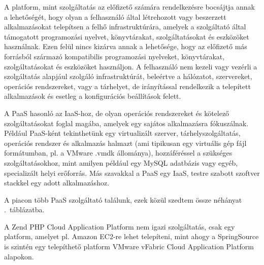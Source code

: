 A platform, mint szolgáltatás az előfizető számára rendelkezésre bocsájtja annak a lehetőségét, hogy olyan a felhasználó által létrehozott vagy beszerzett alkalmazásokat telepítsen a felhő infrastruktúrára, amelyek a szolgáltató által támogatott programozási nyelvet, könyvtárakat, szolgáltatásokat és eszközöket használnak. Ezen felül nincs kizárva  annak a lehetősége, hogy az előfizető más forrásból származó kompatibilis programozási nyelveket, könyvtárakat, szolgáltatásokat és eszközöket használjon. A felhasználó nem kezeli vagy vezérli a szolgáltatás alapjául szolgáló infrastruktúrát, beleértve a hálózatot, szervereket, operációs rendszereket, vagy a tárhelyet, de irányítással rendelkezik a telepített alkalmazások és esetleg a konfigurációs beállítások felett.\cite{nistsp800-145}

A PaaS hasonló az IaaS-hoz, de olyan operációs rendszereket és kötelező szolgáltatásokat foglal magába, amelyek egy sajátos alkalmazásra fókuszálnak. Például PaaS-ként tekinthetünk egy virtualizált szerver, tárhelyszolgáltatás, operációs rendszer és alkalmazás halmazt (ami tipikusan egy virtuális gép fájl formátumban, pl. a VMware .vmdk állománya), hozzáféréssel a szükséges szolgáltatásokhoz, mint amilyen például egy MySQL adatbázis vagy egyéb, specializált helyi erőforrás. Más szavakkal a PaaS egy IaaS, testre szabott szoftver stackkel egy adott alkalmazáshoz.\cite{ccwlinux}

A piacon több PaaS szolgáltató találunk, ezek közül szedtem össze néhányat .~táblázatba.

 

A Zend PHP Cloud Application Platform nem igazi szolgáltatás, csak egy platform, amelyet pl. Amazon EC2-re lehet telepíteni, mint ahogy a SpringSource is szintén egy telepíthető platform VMware vFabric Cloud Application Platform alapokon.

